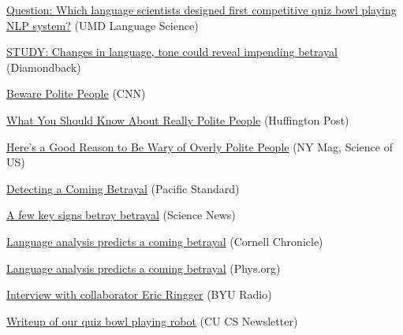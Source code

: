 \documentclass[10pt,a4paper]{article} %
\begin{document}
\begin{itemize*}
\item \href{https://languagescience.umd.edu/news/question-which-language-scientists-designed-first-competitive-quiz-bowl-playing-nlp-system}{Question: Which language scientists designed first competitive quiz bowl playing NLP system?} (UMD Language Science)
\item \href{http://www.diamondbackonline.com/news/study-changes-in-language-tone-could-reveal-impending-betrayal/article_a4da0a7c-50f4-11e5-80d6-030e2fec745c.html}{STUDY: Changes in language, tone could reveal impending betrayal} (Diamondback)
\item \href{http://www.cnn.com/2015/08/31/health/beware-polite-people/}{Beware Polite People} (CNN)
\item \href{http://www.huffingtonpost.com/entry/polite-people-more-likely-to-betray_55e06f5ae4b0b7a96338a186}{What You Should Know About Really Polite People} (Huffington Post)
\item \href{http://nymag.com/scienceofus/2015/08/good-reason-to-be-wary-of-overly-polite-people.html?mid=twitter_nymag}{Here's a Good Reason to Be Wary of Overly Polite People} (NY Mag, Science of US)
\item \href{http://www.psmag.com/health-and-behavior/diplomacy-detecting-a-coming-betrayal}{Detecting
    a Coming Betrayal} (Pacific Standard)
\item \href{https://www.sciencenews.org/blog/culture-beaker/few-key-signs-betray-betrayal?mode=blog&context=159}{A few key signs betray betrayal} (Science News)
\item \href{http://www.news.cornell.edu/stories/2015/08/language-analysis-predicts-coming-betrayal}{Language analysis predicts a coming betrayal} (Cornell Chronicle)
\item \href{http://phys.org/news/2015-08-language-analysis-betrayal.html}{Language analysis predicts a coming betrayal} (Phys.org)
\item \href{https://cs.byu.edu/article/prof-ringger-and-natural-language-pr\
ocessing}{Interview with collaborator Eric Ringger} (BYU Radio)
\item \href{http://www.colorado.edu/cs/2015/07/23/professor%
bowl-robot-goes-head-head-humans}{Writeup of our quiz bowl playing robot} (CU CS Newsletter)
\end{itemize*}
\end{document}
